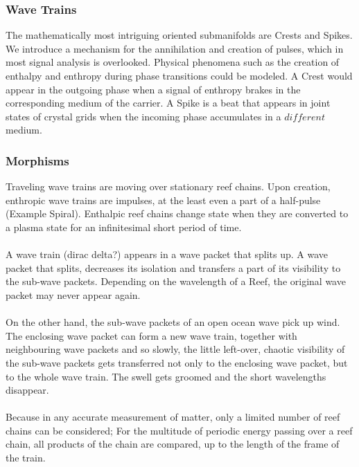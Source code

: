 \documentclass{article}
\begin{document}
\subsubsection{Wave Trains}
The mathematically most intriguing oriented submanifolds are Crests and Spikes. We introduce a mechanism for the annihilation and creation of pulses, which in most signal analysis is overlooked. Physical phenomena such as the creation of enthalpy and enthropy during phase transitions could be modeled. A Crest would appear in the outgoing phase when a signal of enthropy brakes in the corresponding medium of the carrier. A Spike is a beat that appears in joint states of crystal grids when the incoming phase accumulates in a $different$ medium.

\subsubsection{Morphisms}
Traveling wave trains are moving over stationary reef chains. Upon creation, enthropic wave trains are impulses, at the least even a part of a half-pulse (Example Spiral). Enthalpic reef chains change state when they are converted to a plasma state for an infinitesimal short period of time.\\\\
A wave train (dirac delta?) appears in a wave packet that splits up. A wave packet that splits, decreases its isolation and transfers a part of its visibility to the sub-wave packets. Depending on the wavelength of a Reef, the original wave packet may never appear again.\\\\
On the other hand, the sub-wave packets of an open ocean wave pick up wind. The enclosing wave packet can form a new wave train, together with neighbouring wave packets and so slowly, the little left-over, chaotic visibility of the sub-wave packets gets transferred not only to the enclosing wave packet, but to the whole wave train. The swell gets groomed and the short wavelengths disappear.\\\\
Because in any accurate measurement of matter, only a limited number of reef chains can be considered; For the multitude of periodic energy passing over a reef chain, all products of the chain are compared, up to the length of the frame of the train.

\printbibliography
\end{document}
